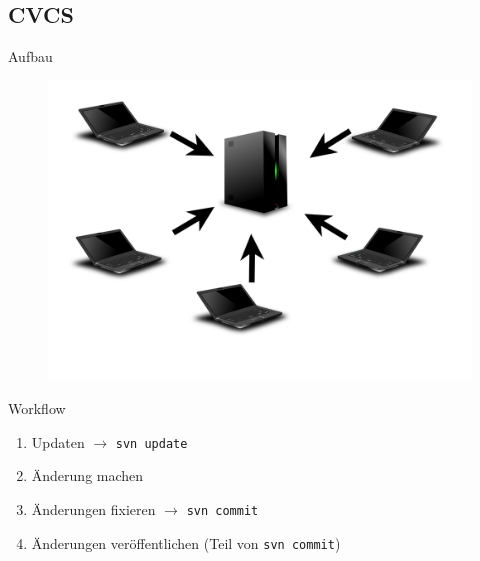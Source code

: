 \documentclass[presentation]{beamer}
\begin{document}
\subsection{CVCS}
\begin{frame}{Aufbau}
  \begin{figure}
    \centering
    \includegraphics[width=\textwidth]{img/cvcs}
  \end{figure}
\end{frame}
\begin{frame}{Workflow}
  \begin{enumerate}[<+->]
  \item Updaten $\rightarrow$ \texttt{svn update}
  \item Änderung machen
  \item Änderungen fixieren $\rightarrow$ \texttt{svn commit}
  \item Änderungen veröffentlichen (Teil von \texttt{svn commit})
  \end{enumerate}
\end{frame}
\end{document}
